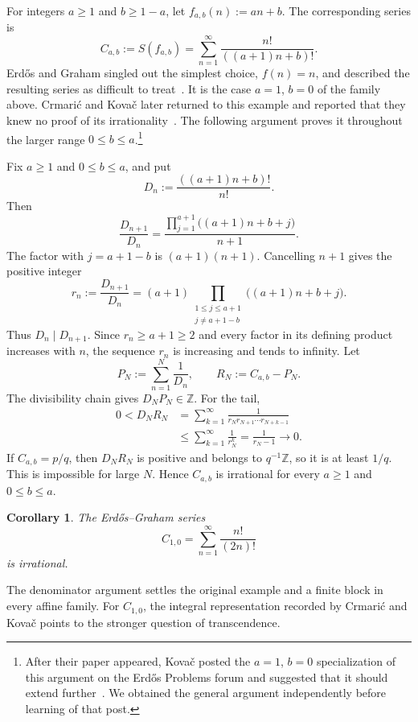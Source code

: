 \documentclass[12pt]{article}
\newtheorem*{corollary}{Corollary}
\begin{document}
For integers $a\geq1$ and $b\geq1-a$, let $f_{a,b}(n):=an+b$. The corresponding series is
\[
C_{a,b}:=S(f_{a,b})=\sum_{n=1}^{\infty}\frac{n!}{((a+1)n+b)!}.
\]
Erd\H{o}s and Graham singled out the simplest choice, $f(n)=n$, and described the resulting series as difficult to treat~\cite[pp.~65--66]{erdos-graham}. It is the case $a=1$, $b=0$ of the family above. Crmari\'c and Kova\v{c} later returned to this example and reported that they knew no proof of its irrationality~\cite[p.~55, following (1.1)]{crmaric-kovac}. The following argument proves it throughout the larger range $0\leq b\leq a$.\footnote{After their paper appeared, Kova\v{c} posted the $a=1$, $b=0$ specialization of this argument on the Erd\H{o}s Problems forum and suggested that it should extend further~\cite{kovac-forum}. We obtained the general argument independently before learning of that post.}

Fix $a\geq1$ and $0\leq b\leq a$, and put
\[
D_n:=\frac{((a+1)n+b)!}{n!}.
\]
Then
\[
\frac{D_{n+1}}{D_n}
=\frac{\displaystyle\prod_{j=1}^{a+1}\bigl((a+1)n+b+j\bigr)}{n+1}.
\]
The factor with $j=a+1-b$ is $(a+1)(n+1)$. Cancelling $n+1$ gives the positive integer
\[
r_n:=\frac{D_{n+1}}{D_n}
=(a+1)
\prod_{\substack{1\leq j\leq a+1\\j\neq a+1-b}}
\bigl((a+1)n+b+j\bigr).
\]
Thus $D_n\mid D_{n+1}$. Since $r_n\geq a+1\geq2$ and every factor in its defining product increases with $n$, the sequence $r_n$ is increasing and tends to infinity. Let
\[
P_N:=\sum_{n=1}^{N}\frac1{D_n},
\qquad
R_N:=C_{a,b}-P_N.
\]
The divisibility chain gives $D_NP_N\in\mathbb Z$. For the tail,
\[
\begin{aligned}
0<D_NR_N
&=\sum_{k=1}^{\infty}
\frac1{r_Nr_{N+1}\cdots r_{N+k-1}}\\
&\leq\sum_{k=1}^{\infty}\frac1{r_N^k}
=\frac1{r_N-1}
\longrightarrow0.
\end{aligned}
\]
If $C_{a,b}=p/q$, then $D_NR_N$ is positive and belongs to $q^{-1}\mathbb Z$, so it is at least $1/q$. This is impossible for large $N$. Hence $C_{a,b}$ is irrational for every $a\geq1$ and $0\leq b\leq a$.

\begin{corollary}
The Erd\H{o}s--Graham series
\[
C_{1,0}=\sum_{n=1}^{\infty}\frac{n!}{(2n)!}
\]
is irrational.
\end{corollary}

The denominator argument settles the original example and a finite block in every affine family. For $C_{1,0}$, the integral representation recorded by Crmari\'c and Kova\v{c} points to the stronger question of transcendence.
\end{document}
